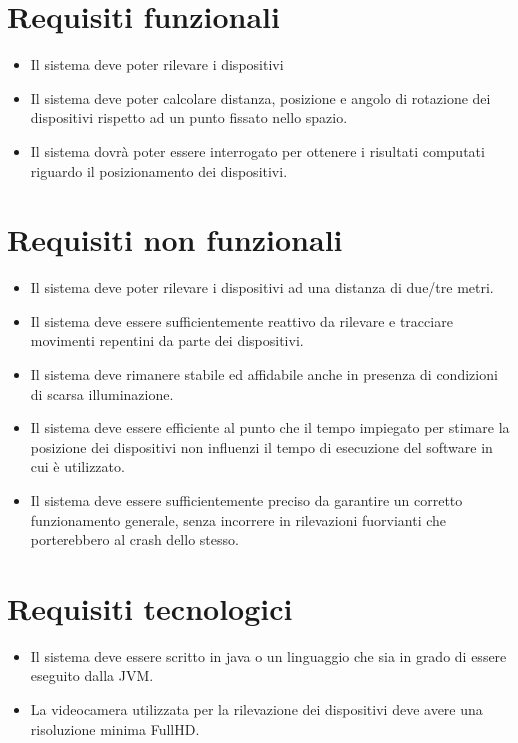 \documentclass[12pt,a4paper,openright,twoside]{book}
\begin{document}
\section{Requisiti funzionali} \label{sec:requisiti_funzionali}
\begin{itemize}
	\item Il sistema deve poter rilevare i dispositivi
	\item Il sistema deve poter calcolare distanza, posizione e angolo di rotazione dei dispositivi rispetto ad un punto fissato nello spazio.
	\item Il sistema dovrà poter essere interrogato per ottenere i risultati computati riguardo il posizionamento dei dispositivi.
\end{itemize}
\section{Requisiti non funzionali} \label{sec:requisiti_non_funzionali}
\begin{itemize}
	\item Il sistema deve poter rilevare i dispositivi ad una distanza di due/tre metri.
	\item Il sistema deve essere sufficientemente reattivo da rilevare e tracciare movimenti repentini da parte dei dispositivi.
	\item Il sistema deve rimanere stabile ed affidabile anche in presenza di condizioni di scarsa illuminazione.
	\item Il sistema deve essere efficiente al punto che il tempo impiegato per stimare la posizione dei dispositivi non influenzi il tempo di esecuzione del software in cui è utilizzato.
	\item Il sistema deve essere sufficientemente preciso da garantire un corretto funzionamento generale, senza incorrere in rilevazioni fuorvianti che porterebbero al crash dello stesso.
\end{itemize}
\section{Requisiti tecnologici}
\begin{itemize}
	\item Il sistema deve essere scritto in java o un linguaggio che sia in grado di essere eseguito dalla JVM.
	\item La videocamera utilizzata per la rilevazione dei dispositivi deve avere una risoluzione minima \gls{FullHD}.
\end{itemize}
\end{document}

